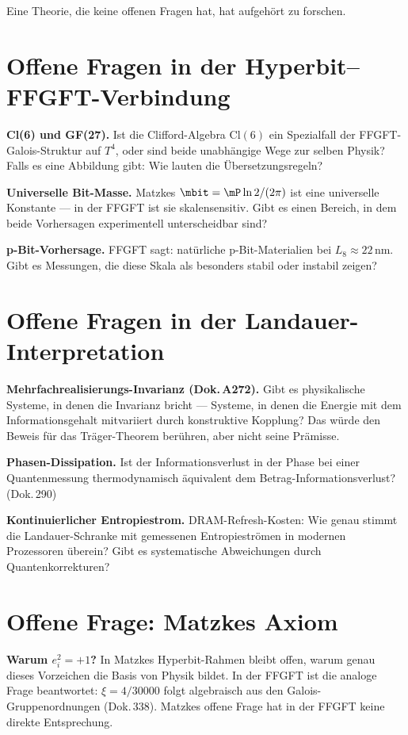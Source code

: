 \label{ch:offene_fragen}

\epigraph{Eine Theorie, die keine offenen Fragen hat, hat aufgehört zu forschen.}{}

\section{Offene Fragen in der Hyperbit--FFGFT-Verbindung}

\textbf{Cl(6) und GF(27).}
Ist die Clifford-Algebra $\mathrm{Cl}(6)$ ein Spezialfall der FFGFT-Galois-Struktur
auf $T^4$, oder sind beide unabhängige Wege zur selben Physik? Falls es eine
Abbildung gibt: Wie lauten die Übersetzungsregeln?

\textbf{Universelle Bit-Masse.}
Matzkes $\mbit = \mP \ln 2 / (2\pi)$ ist eine universelle Konstante ---
in der FFGFT ist sie skalensensitiv. Gibt es einen Bereich, in dem beide
Vorhersagen experimentell unterscheidbar sind?

\textbf{p-Bit-Vorhersage.}
FFGFT sagt: natürliche p-Bit-Materialien bei $L_8 \approx 22\,\text{nm}$.
Gibt es Messungen, die diese Skala als besonders stabil oder instabil zeigen?

\section{Offene Fragen in der Landauer-Interpretation}

\textbf{Mehrfachrealisierungs-Invarianz (Dok.\,A272).}
Gibt es physikalische Systeme, in denen die Invarianz bricht --- Systeme, in
denen die Energie mit dem Informationsgehalt mitvariiert durch konstruktive
Kopplung? Das würde den Beweis für das Träger-Theorem berühren, aber nicht
seine Prämisse.

\textbf{Phasen-Dissipation.}
Ist der Informationsverlust in der Phase bei einer Quantenmessung
thermodynamisch äquivalent dem Betrag-Informationsverlust? (Dok.\,290)

\textbf{Kontinuierlicher Entropiestrom.}
DRAM-Refresh-Kosten: Wie genau stimmt die Landauer-Schranke mit gemessenen
Entropieströmen in modernen Prozessoren überein? Gibt es systematische
Abweichungen durch Quantenkorrekturen?

\section{Offene Frage: Matzkes Axiom}

\textbf{Warum $e_i^2 = +1$?}
In Matzkes Hyperbit-Rahmen bleibt offen, warum genau dieses Vorzeichen
die Basis von Physik bildet. In der FFGFT ist die analoge Frage beantwortet:
$\xi = 4/30000$ folgt algebraisch aus den Galois-Gruppenordnungen (Dok.\,338).
Matzkes offene Frage hat in der FFGFT keine direkte Entsprechung.

